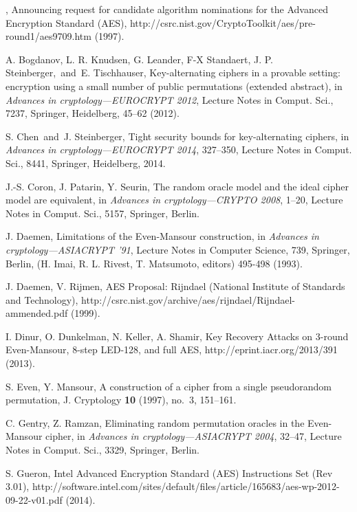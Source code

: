 \documentclass{llncs}
\begin{document}
\begin{thebibliography}{99}

 \textendash, Announcing request for candidate algorithm nominations for the Advanced Encryption Standard (AES),
http://csrc.nist.gov/CryptoToolkit/aes/pre-round1/aes\textunderscore 9709.htm (1997).

A. Bogdanov, L. R. Knudsen, G. Leander, F-X Standaert, J. P. Steinberger,\ and\ E. Tischhauser, Key-alternating ciphers in a provable setting: encryption using a small number of public permutations (extended abstract), in {\it Advances in cryptology---EUROCRYPT 2012}, Lecture Notes in Comput. Sci., 7237, Springer, Heidelberg, 45--62 (2012).

S. Chen\ and\  J. Steinberger, Tight security bounds for key-alternating ciphers, in {\it Advances in cryptology---EUROCRYPT 2014}, 327--350, Lecture Notes in Comput. Sci., 8441, Springer, Heidelberg, 2014.

J.-S. Coron, J. Patarin, Y. Seurin, The random oracle model and the ideal cipher model are equivalent, in {\it Advances in cryptology---CRYPTO 2008}, 1--20, Lecture Notes in Comput. Sci., 5157, Springer, Berlin. 

J. Daemen, Limitations of the Even-Mansour construction, in
{\it Advances in cryptology---ASIACRYPT '91}, Lecture Notes in Computer Science, 739, Springer, Berlin, (H. Imai, R. L. Rivest, T. Matsumoto, editors) 495-498 (1993).

J. Daemen, V. Rijmen, AES Proposal: Rijndael (National Institute of Standards and Technology),
http://csrc.nist.gov/archive/aes/rijndael/Rijndael-ammended.pdf (1999).

I. Dinur, O. Dunkelman, N. Keller, A. Shamir, Key Recovery Attacks on 3-round Even-Mansour, 8-step LED-128, and full AES, http://eprint.iacr.org/2013/391 (2013).

S. Even, Y. Mansour, A construction of a cipher from a single pseudorandom permutation, J. Cryptology {\bf 10} (1997), no.~3, 151--161.

C. Gentry, Z. Ramzan, Eliminating random permutation oracles in the Even-Mansour cipher, in {\it Advances in cryptology---ASIACRYPT 2004}, 32--47, Lecture Notes in Comput. Sci., 3329, Springer, Berlin.

S. Gueron, Intel Advanced Encryption Standard (AES) Instructions Set (Rev 3.01),
http://software.intel.com/sites/default/files/article/165683/aes-wp-2012-09-22-v01.pdf (2014).


\end{thebibliography}
\end{document}
